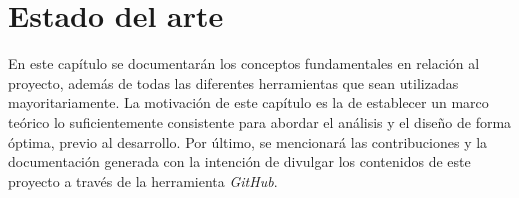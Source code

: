 \chapter{Estado del arte}
\label{estadoArte}

En este capítulo se documentarán los conceptos fundamentales en relación al proyecto, además de todas las diferentes herramientas que sean utilizadas mayoritariamente. La motivación de este capítulo es la de establecer un marco teórico lo suficientemente consistente para abordar el análisis y el diseño de forma óptima, previo al desarrollo. Por último, se mencionará las contribuciones y la documentación generada con la intención de divulgar los contenidos de este proyecto a través de la herramienta \textit{GitHub}.










\newpage



\newpage





\newpage








\newpage


\newpage